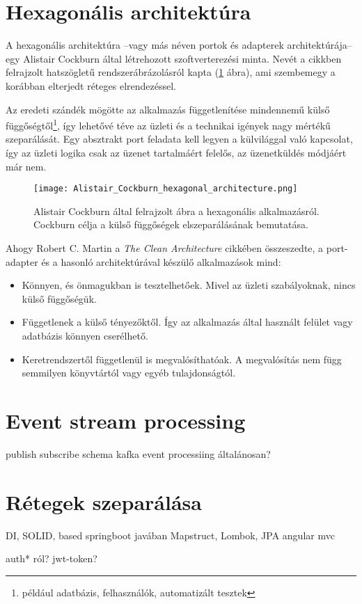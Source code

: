 \section{Hexagonális architektúra}
A hexagonális architektúra --vagy más néven portok és adapterek architektúrája-- egy \foreignlanguage{british}{Alistair Cockburn} által létrehozott \cite{Alistair_Cockburn} szoftverterezési minta. Nevét a cikkben felrajzolt hatszögletű rendszerábrázolásról kapta (\ref{fig:Alistair_Cockburn_hexagonal_architecture} ábra), ami szembemegy a korábban elterjedt réteges elrendezéssel.

Az eredeti szándék mögötte az alkalmazás függetlenítése mindennemű külső függőségtől\footnote{például adatbázis, felhasználók, automatizált tesztek}, így lehetővé téve az üzleti és a technikai igények nagy mértékű szeparálását.
Egy absztrakt port feladata kell legyen a külvilággal való kapcsolat, így az üzleti logika csak az üzenet tartalmáért felelős, az üzenetküldés módjáért már nem.

\begin{figure}[hbt] 
	\centering
		\texttt{[image: Alistair\_Cockburn\_hexagonal\_architecture.png]}
	\caption[Hexagonális alkalmazások felépítése]{\foreignlanguage{british}{Alistair Cockburn} által \cite{Alistair_Cockburn} felrajzolt ábra a hexagonális alkalmazásról. Cockburn célja a külső függőségek elszeparálásának bemutatása.
}\label{fig:Alistair_Cockburn_hexagonal_architecture}
\end{figure}

Ahogy \foreignlanguage{british}{Robert C. Martin} a \foreignlanguage{british}{\textit{The Clean Architecture}} cikkében \cite{The_Clean_Architecture} összeszedte, a port-adapter és a hasonló architektúrával készülő alkalmazások mind:	
\begin{itemize}
	\item Könnyen, és önmagukban is tesztelhetőek. Mivel az üzleti szabályoknak, nincs külső függőségük.
	
	\item Függetlenek a külső tényezőktől. Így az alkalmazás által használt felület vagy adatbázis könnyen cserélhető.
	
	\item Keretrendszertől függetlenül is megvalósíthatóak. A megvalósítás nem függ semmilyen könyvtártól vagy egyéb tulajdonságtól.
\end{itemize}
	
	

\section{Event stream processing}
publish subscribe
 schema
 kafka
event processiing általánosan?


\section{Rétegek szeparálása}\label{sec:retegek_szeparalasa}
	DI, SOLID,
based springboot  javában 	Mapstruct, 	Lombok,  JPA
angular mvc		



auth* ról? jwt-token?

